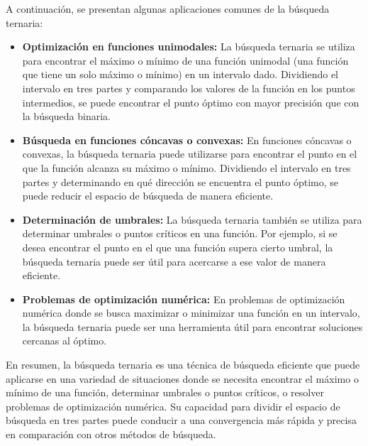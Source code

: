 A continuación, se presentan algunas aplicaciones comunes de la búsqueda ternaria:
\begin{itemize}
	\item \textbf{Optimización en funciones unimodales:} La búsqueda ternaria se utiliza para encontrar el máximo o mínimo de una función unimodal (una función que tiene un solo máximo o mínimo) en un intervalo dado. Dividiendo el intervalo en tres partes y comparando los valores de la función en los puntos intermedios, se puede encontrar el punto óptimo con mayor precisión que con la búsqueda binaria.
	\item \textbf{Búsqueda en funciones cóncavas o convexas:} En funciones cóncavas o convexas, la búsqueda ternaria puede utilizarse para encontrar el punto en el que la función alcanza su máximo o mínimo. Dividiendo el intervalo en tres partes y determinando en qué dirección se encuentra el punto óptimo, se puede reducir el espacio de búsqueda de manera eficiente.
	\item \textbf{Determinación de umbrales:} La búsqueda ternaria también se utiliza para determinar umbrales o puntos críticos en una función. Por ejemplo, si se desea encontrar el punto en el que una función supera cierto umbral, la búsqueda ternaria puede ser útil para acercarse a ese valor de manera eficiente.
	\item \textbf{Problemas de optimización numérica:} En problemas de optimización numérica donde se busca maximizar o minimizar una función en un intervalo, la búsqueda ternaria puede ser una herramienta útil para encontrar soluciones cercanas al óptimo.
\end{itemize}
 
En resumen, la búsqueda ternaria es una técnica de búsqueda eficiente que puede aplicarse en una variedad de situaciones donde se necesita encontrar el máximo o mínimo de una función, determinar umbrales o puntos críticos, o resolver problemas de optimización numérica. Su capacidad para dividir el espacio de búsqueda en tres partes puede conducir a una convergencia más rápida y precisa en comparación con otros métodos de búsqueda.